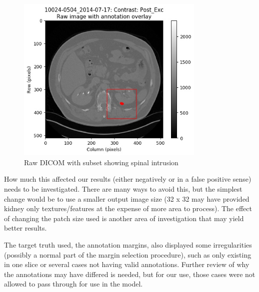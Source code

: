\documentclass[conference]{IEEEtran}
\begin{document}
\begin{figure}[h]
\includegraphics[width=9cm]{annotation_10024-0504_2014-07-17_0056}
  \caption{Raw DICOM with subset showing spinal intrusion}
  \label{fig:Spinal Intrusion}
\end{figure}

How much this affected our results (either negatively or in a false positive sense) needs to be investigated. There are many ways to avoid this, but the simplest change would be to use a smaller output image size (32 x 32 may have provided kidney only  textures/features at the expense of more area to process). The effect of changing the patch size used is another area of investigation that may yield better results. 

The target truth used, the annotation margins, also displayed some irregularities (possibly a normal part of the margin selection procedure), such as only existing in one slice or several cases not having valid annotations. Further review of why the annotations may have differed is needed, but for our use, those cases were not allowed to pass through for use in the model. 

\hfill \\
\listoffigures
\end{document}
